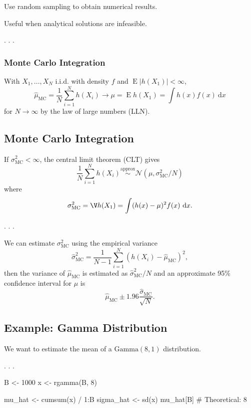 \documentclass[
  letterpaper,
  DIV=11,
  numbers=noendperiod]{scrartcl}
\newenvironment{Shaded}{\begin{snugshade}}{\end{snugshade}}
\newcommand{\CommentTok}[1]{\textcolor[rgb]{0.37,0.37,0.37}{#1}}
\newcommand{\DecValTok}[1]{\textcolor[rgb]{0.68,0.00,0.00}{#1}}
\newcommand{\FunctionTok}[1]{\textcolor[rgb]{0.28,0.35,0.67}{#1}}
\newcommand{\NormalTok}[1]{\textcolor[rgb]{0.00,0.23,0.31}{#1}}
\newcommand{\OtherTok}[1]{\textcolor[rgb]{0.00,0.23,0.31}{#1}}
\newcommand{\SpecialCharTok}[1]{\textcolor[rgb]{0.37,0.37,0.37}{#1}}
\begin{document}
Use random sampling to obtain numerical results.

\medskip\pause

Useful when analytical solutions are infeasible.

. . .

\subsubsection{Monte Carlo Integration}\label{monte-carlo-integration}

With \(X_1, \ldots, X_N\) i.i.d. with density \(f\) and
\(\operatorname{E}|h(X_1)| < \infty\), \[
  \hat{\mu}_{\mathrm{MC}} = \frac{1}{N} \sum_{i=1}^N h(X_i) \rightarrow \mu
                          = \operatorname{E}h(X_1) = \int h(x) f(x) \ \mathrm{d}x
\] for \(N \to \infty\) by the law of large numbers (LLN).

\subsection{Monte Carlo Integration}\label{monte-carlo-integration-1}

If \(\sigma^2_{\mathrm{MC}} < \infty\), the central limit theorem (CLT)
gives \[
  \frac{1}{N} \sum_{i=1}^N h(X_i) \overset{\mathrm{approx}}
  \sim \mathcal{N}(\mu, \sigma^2_{\mathrm{MC}} / N)
\] where \[
  \sigma^2_{\mathrm{MC}} = \V h(X_1) = \int (h(x) - \mu)^2 f(x) \ \mathrm{d}x.
\]

. . .

We can estimate \(\sigma^2_{\mathrm{MC}}\) using the empirical variance
\[
  \hat{\sigma}^2_{\mathrm{MC}}
  = \frac{1}{N - 1} \sum_{i=1}^N (h(X_i) - \hat{\mu}_{\mathrm{MC}})^2,
\] then the variance of \(\hat{\mu}_{\mathrm{MC}}\) is estimated as
\(\hat{\sigma}^2_{\mathrm{MC}} / N\) and an approximate 95\% confidence
interval for \(\mu\) is \[
  \hat{\mu}_{\mathrm{MC}} \pm 1.96 \frac{\hat{\sigma}_{\mathrm{MC}}}{\sqrt{N}}.
\]

\subsection{Example: Gamma
Distribution}\label{example-gamma-distribution}

We want to estimate the mean of a \(\mathrm{Gamma}(8,1)\) distribution.

. . .

\begin{Shaded}
\begin{Highlighting}[]
\NormalTok{B }\OtherTok{\textless{}{-}} \DecValTok{1000}
\NormalTok{x }\OtherTok{\textless{}{-}} \FunctionTok{rgamma}\NormalTok{(B, }\DecValTok{8}\NormalTok{)}

\NormalTok{mu\_hat }\OtherTok{\textless{}{-}} \FunctionTok{cumsum}\NormalTok{(x) }\SpecialCharTok{/} \DecValTok{1}\SpecialCharTok{:}\NormalTok{B}
\NormalTok{sigma\_hat }\OtherTok{\textless{}{-}} \FunctionTok{sd}\NormalTok{(x)}
\NormalTok{mu\_hat[B] }\CommentTok{\# Theoretical: 8}
\end{Highlighting}
\end{Shaded}
\end{document}
